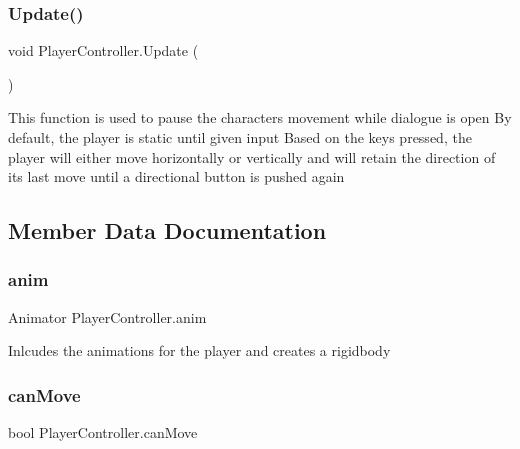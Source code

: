 \subsubsection{\texorpdfstring{Update()}{Update()}}
{\footnotesize\ttfamily void Player\+Controller.\+Update (\begin{DoxyParamCaption}{ }\end{DoxyParamCaption})\hspace{0.3cm}{\ttfamily [private]}}



This function is used to pause the character\textquotesingle{}s movement while dialogue is open By default, the player is static until given input Based on the keys pressed, the player will either move horizontally or vertically and will retain the direction of it\textquotesingle{}s last move until a directional button is pushed again 



\subsection{Member Data Documentation}
\mbox{\label{class_player_controller_ac646d94772588e3393eb5cb9ac02a5c4}} 
\subsubsection{\texorpdfstring{anim}{anim}}
{\footnotesize\ttfamily Animator Player\+Controller.\+anim\hspace{0.3cm}{\ttfamily [private]}}



Inlcudes the animations for the player and creates a rigidbody 

\mbox{\label{class_player_controller_a14bb057d727180f87728bd6fe62dffc9}} 
\subsubsection{\texorpdfstring{can\+Move}{canMove}}
{\footnotesize\ttfamily bool Player\+Controller.\+can\+Move}



